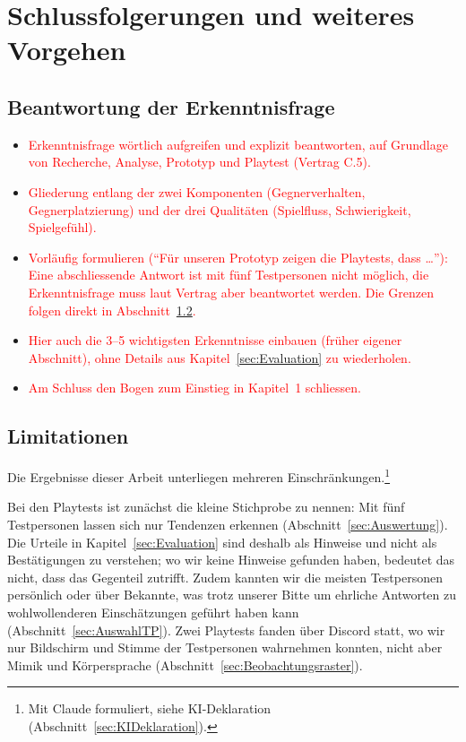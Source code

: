 \documentclass[../Main.tex]{subfiles}
\begin{document}
\section{Schlussfolgerungen und weiteres Vorgehen} \label{sec:Schlussfolgerungen}

\subsection{Beantwortung der Erkenntnisfrage} \label{sec:Beantwortung}

\begin{itemize}[leftmargin=1.5cm]
    \item \textcolor{red}{Erkenntnisfrage wörtlich aufgreifen und explizit beantworten, auf Grundlage von Recherche, Analyse, Prototyp und Playtest (Vertrag C.5).}
    \item \textcolor{red}{Gliederung entlang der zwei Komponenten (Gegnerverhalten, Gegnerplatzierung) und der drei Qualitäten (Spielfluss, Schwierigkeit, Spielgefühl).}
    \item \textcolor{red}{Vorläufig formulieren (\enquote{Für unseren Prototyp zeigen die Playtests, dass \ldots}): Eine abschliessende Antwort ist mit fünf Testpersonen nicht möglich, die Erkenntnisfrage muss laut Vertrag aber beantwortet werden. Die Grenzen folgen direkt in Abschnitt~\ref{sec:Limitationen}.}
    \item \textcolor{red}{Hier auch die 3--5 wichtigsten Erkenntnisse einbauen (früher eigener Abschnitt), ohne Details aus Kapitel~\ref{sec:Evaluation} zu wiederholen.}
    \item \textcolor{red}{Am Schluss den Bogen zum Einstieg in Kapitel~1 schliessen.}
\end{itemize}

\subsection{Limitationen} \label{sec:Limitationen}

Die Ergebnisse dieser Arbeit unterliegen mehreren Einschränkungen.\footnote{Mit Claude formuliert, siehe KI-Deklaration (Abschnitt~\ref{sec:KIDeklaration}).}

Bei den Playtests ist zunächst die kleine Stichprobe zu nennen: Mit fünf Testpersonen lassen sich nur Tendenzen erkennen (Abschnitt~\ref{sec:Auswertung}). Die Urteile in Kapitel~\ref{sec:Evaluation} sind deshalb als Hinweise und nicht als Bestätigungen zu verstehen; wo wir keine Hinweise gefunden haben, bedeutet das nicht, dass das Gegenteil zutrifft. Zudem kannten wir die meisten Testpersonen persönlich oder über Bekannte, was trotz unserer Bitte um ehrliche Antworten zu wohlwollenderen Einschätzungen geführt haben kann (Abschnitt~\ref{sec:AuswahlTP}). Zwei Playtests fanden über Discord statt, wo wir nur Bildschirm und Stimme der Testpersonen wahrnehmen konnten, nicht aber Mimik und Körpersprache (Abschnitt~\ref{sec:Beobachtungsraster}).
\end{document}
